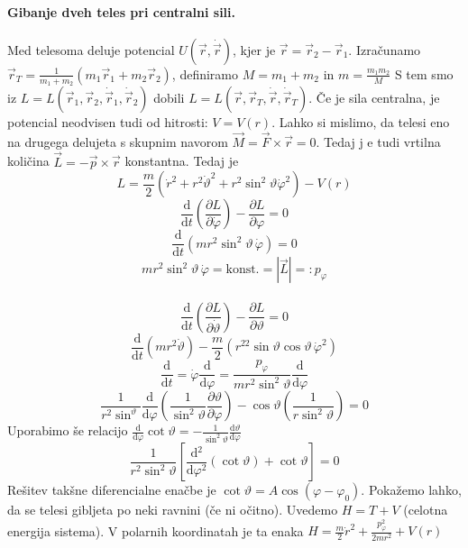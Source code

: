 \documentclass[a4paper]{article}
\newcommand{\vct}[1]{\overrightarrow{#1}}
\newcommand{\pd}[2]{\frac{\partial {#1}}{\partial {#2}}}
\newcommand{\dd}[2]{\frac{\mathrm{d} {#1}}{\mathrm{d} {#2}}}
\begin{document}
\paragraph{Gibanje dveh teles pri centralni sili.} Med telesoma deluje potencial $U(\vct{r}, \dot{\vct{r}})$, kjer je $\vct{r} = \vct{r}_2 - \vct{r}_1$.
Izračunamo $\vct{r}_T = \frac{1}{m_1 + m_2}(m_1\vct{r}_1 + m_2\vct{r}_2)$, definiramo $M = m_1 + m_2$ in $\displaystyle{m = \frac{m_1m_2}{M}}$
S tem smo iz $L = L(\vct{r}_1, \vct{r}_2, \dot{\vct{r}}_1, \dot{\vct{r}}_2)$ dobili $L = L(\vct{r}, \vct{r}_T, \dot{\vct{r}}, \dot{\vct{r}}_T)$.
Če je sila centralna, je potencial neodvisen tudi od hitrosti: $V = V(r)$. Lahko si mislimo, da telesi eno na drugega delujeta s skupnim navorom
$\vct{M} = \vct{F} \times \vct{r} = 0$. Tedaj j e tudi vrtilna količina $\vct{L} = - \vct{p} \times \vct{r}$ konstantna. Tedaj je
$$L = \frac{m}{2}\left(\dot{r}^2 + r^2\dot{\vartheta}^2 + r^2\sin^2\vartheta\dot\varphi^2\right) - V(r)$$
$$\dd{}{t}\left(\pd{L}{\dot{\varphi}}\right) - \pd{L}{\varphi} = 0$$
$$\dd{}{t}\left(mr^2\sin^2\vartheta\,\dot{\varphi}\right) = 0$$
$$mr^2\sin^2\vartheta\,\dot{\varphi} = \text{konst.} = |\vct{L}| =: p_\varphi$$
\\
$$\dd{}{t} \left(\pd{L}{\dot\vartheta}\right) - \pd{L}{\vartheta} = 0$$
$$\dd{}{t}\left(mr^2\dot\vartheta\right) - \frac{m}{2}\left(r^22\sin\vartheta\cos\vartheta\,\dot{\varphi}^2\right)$$
$$\dd{}{t} = \dot{\varphi} \dd{}{\varphi} = \frac{p_\varphi}{mr^2\sin^2\vartheta}\dd{}{\varphi}$$
$$\frac{1}{r^2\sin^\vartheta} \dd{}{\varphi} (\frac{1}{\sin^2\vartheta}\pd{\vartheta}{\varphi}) - \cos\vartheta\left(\frac{1}{r\sin^2\vartheta}\right) = 0$$
Uporabimo še relacijo $\displaystyle{\dd{}{\varphi}\cot\vartheta = -\frac{1}{\sin^2\vartheta}\dd{\vartheta}{\varphi}}$
$$\frac{1}{r^2\sin^2\vartheta}\left[\dd{^2}{\varphi^2}(\cot\vartheta) + \cot\vartheta\right] = 0$$
Rešitev takšne diferencialne enačbe je $\cot\vartheta = A\cos(\varphi - \varphi_0)$.
Pokažemo lahko, da se telesi gibljeta po neki ravnini (če ni očitno). Uvedemo $H = T + V$ (celotna energija sistema).
V polarnih koordinatah je ta enaka $\displaystyle{H = \frac{m}{2}\dot{r}^2 + \frac{p_\varphi^2}{2mr^2}} + V(r)$
\end{document}
